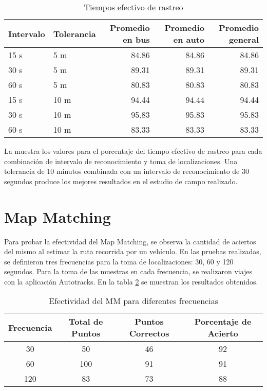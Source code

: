 \begin{table}[h]
  \centering
	\begin{tabular}{llrrr}
	\toprule
	Intervalo & Tolerancia & Promedio en bus & Promedio en auto & Promedio general \\
	\midrule
	15 s      & 5 m        & 84.86           & 84.86            & 84.86            \\
	30 s      & 5 m        & 89.31           & 89.31            & 89.31            \\
	60 s      & 5 m        & 80.83           & 80.83            & 80.83            \\
	15 s      & 10 m       & 94.44           & 94.44            & 94.44            \\
	30 s      & 10 m       & 95.83           & 95.83            & 95.83            \\
	60 s      & 10 m       & 83.33           & 83.33            & 83.33            \\
	\bottomrule
	\end{tabular}
  \caption{Tiempos efectivo de rastreo}
  \label{tab:prom_tiempo_efectivo_rastreo}
\end{table}

La  muestra los valores para el porcentaje del tiempo efectivo de rastreo para cada combinación de intervalo de reconocimiento y toma de localizaciones. Una tolerancia de 10 minutos combinada con un intervalo de reconocimiento de 30 segundos produce los mejores resultados en el estudio de campo realizado.

\section{Map Matching}

Para probar la efectividad del Map Matching, se observa la cantidad de aciertos del mismo al estimar la ruta recorrida por un vehículo. En las pruebas realizadas, se definieron  tres frecuencias para la toma de localizaciones: 30, 60 y 120 segundos. Para la toma de las muestras en cada frecuencia, se realizaron viajes con la aplicación Autotracks. En la tabla \ref{table:map_matching} se muestran los resultados obtenidos.

\begin{table}[ht]
	\caption{Efectividad del MM para diferentes frecuencias} 
	\centering
	\begin{tabular}{c c c c}
		\hline\hline
		Frecuencia & Total de Puntos & Puntos Correctos & Porcentaje de Acierto\\ [0.5ex]
		\hline
		30 & 50 & 46 & 92 \\
		60 & 100 & 91 & 91 \\
		120 & 83 & 73 & 88\\ [1ex]
		\hline
	\end{tabular}
	\label{table:map_matching}
\end{table}
